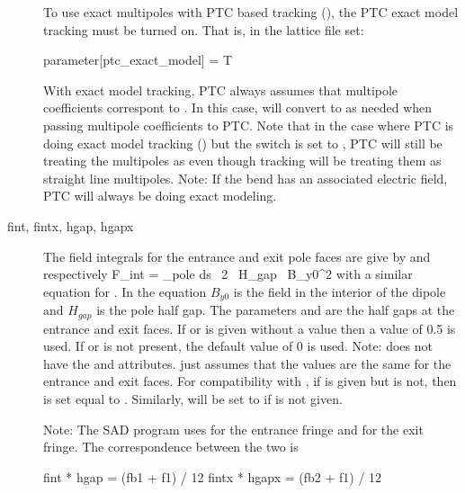 \begin{description}
To use exact multipoles with PTC based tracking (), the PTC exact model
tracking must be turned on. That is, in the lattice file set:
\begin{example}
  parameter[ptc_exact_model] = T
\end{example}
With exact model tracking, PTC always assumes that multipole coefficients correspont to
. In this case, \bmad will convert  to
 as needed when passing multipole coefficients to PTC. Note that in
the case where PTC is doing exact model tracking () but the
 switch is set to , PTC will still be treating the multipoles
as  even though \bmad tracking will be treating them as straight
line multipoles. Note: If the bend has an associated electric field, PTC will always be
doing exact modeling.

  \item[fint, fintx, \Newline hgap, hgapx] \Newline
The field integrals for the entrance and
exit pole faces are give by  and  respectively
\Begineq
  F_{int} = \int_{pole} \! \! ds \, 
  {2 \, H_{gap} \, B_{y0}^2}
  \label{fsbbb}
\Endeq
with a similar equation for . In the equation $B_{y0}$ is the field in the
interior of the dipole and $H_{gap}$ is the pole half gap.  The parameters  and
 are the half gaps at the entrance and exit faces. If  or  is
given without a value then a value of 0.5 is used. If  or  is not
present, the default value of 0 is used. Note: \mad does not have the  and
 attributes. \mad just assumes that the values are the same for the entrance and
exit faces. For compatibility with \mad, if  is given but  is not, then
 is set equal to . Similarly,  will be set to  if
 is not given.

Note: The SAD program uses  for the entrance fringe and
 for the exit fringe. The correspondence between the two is
\begin{example}
  fint  * hgap  = (fb1 + f1) / 12
  fintx * hgapx = (fb2 + f1) / 12
\end{example}


\end{description}

